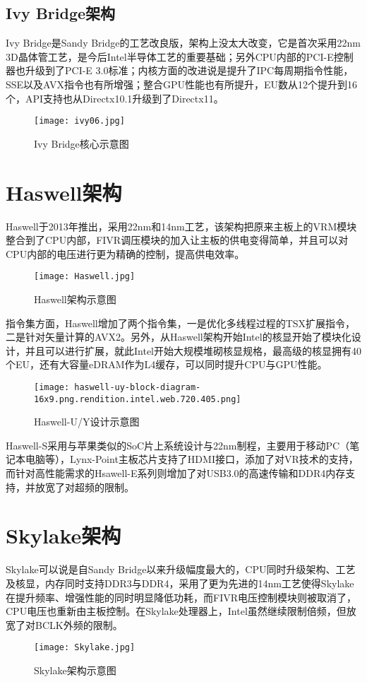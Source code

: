 \documentclass[UTF8]{pkuthss}
\begin{document}
	\subsection{Ivy Bridge架构}
	Ivy Bridge是Sandy Bridge的工艺改良版，架构上没太大改变，它是首次采用22nm 3D晶体管工艺，是今后Intel半导体工艺的重要基础；另外CPU内部的PCI-E控制器也升级到了PCI-E 3.0标准；内核方面的改进说是提升了IPC每周期指令性能，SSE以及AVX指令也有所增强；整合GPU性能也有所提升，EU数从12个提升到16个，API支持也从Directx10.1升级到了Directx11。
		\begin{figure}[ht]
		\texttt{[image: ivy06.jpg]}
		\caption{Ivy Bridge核心示意图}
	\end{figure}
	\section{Haswell架构}
	Haswell于2013年推出，采用22nm和14nm工艺\cite{blog.csdn.net}，该架构把原来主板上的VRM模块整合到了CPU内部，FIVR调压模块的加入让主板的供电变得简单，并且可以对CPU内部的电压进行更为精确的控制，提高供电效率。
	\begin{figure}[ht]
		\texttt{[image: Haswell.jpg]}
		\caption{Haswell架构示意图}
	\end{figure}
	
	指令集方面，Haswell增加了两个指令集，一是优化多线程过程的TSX扩展指令，二是针对矢量计算的AVX2。另外，从Haswell架构开始Intel的核显开始了模块化设计，并且可以进行扩展，就此Intel开始大规模堆砌核显规格，最高级的核显拥有40个EU，还有大容量eDRAM作为L4缓存，可以同时提升CPU与GPU性能。
		\begin{figure}[ht]
		\texttt{[image: haswell-uy-block-diagram-16x9.png.rendition.intel.web.720.405.png]}
		\caption{Haswell-U/Y设计示意图}
	\end{figure}

	Haswell-S采用与苹果类似的SoC片上系统设计与22nm制程，主要用于移动PC（笔记本电脑等），Lynx-Point主板芯片支持了HDMI接口，添加了对VR技术的支持，\cite{www.intel.cn-haswell-u-y}而针对高性能需求的Hsawell-E系列则增加了对USB3.0的高速传输和DDR4内存支持，并放宽了对超频的限制。\cite{www.intel.cn-haswell-e}
	\section{Skylake架构}
	Skylake可以说是自Sandy Bridge以来升级幅度最大的，CPU同时升级架构、工艺及核显，内存同时支持DDR3与DDR4，采用了更为先进的14nm工艺\cite{blog.csdn.net}使得Skylake在提升频率、增强性能的同时明显降低功耗，而FIVR电压控制模块则被取消了，CPU电压也重新由主板控制。在Skylake处理器上，Intel虽然继续限制倍频，但放宽了对BCLK外频的限制。
		\begin{figure}[ht]
		\texttt{[image: Skylake.jpg]}
		\caption{Skylake架构示意图}
	\end{figure}
\end{document}
